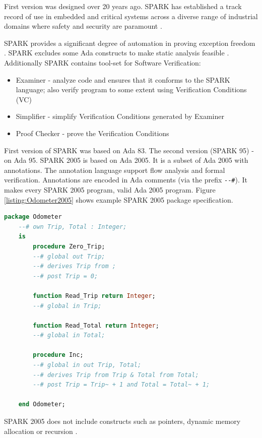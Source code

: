 First version was designed over 20 years ago. SPARK has established a track record of use in embedded and critical systems across a diverse range of industrial domains where safety and security are paramount \cite{Barnes:Book}. 

SPARK provides a significant degree of automation in proving exception freedom \cite{Spark:Article}. SPARK excludes some Ada constructs to make static analysis feasible \cite{Spark:Article}. Additionally SPARK contains tool-set for Software Verification:
\begin{itemize} \itemsep1pt \parskip0pt 
	\item Examiner - analyze code and ensures that it conforms to the SPARK language; also verify program to some extent using Verification Conditions (VC)
	\item Simplifier - simplify Verification Conditions generated by Examiner
	\item Proof Checker - prove the Verification Conditions
\end{itemize}

First version of SPARK was based on Ada 83. The second version (SPARK 95) - on Ada 95. SPARK 2005 is based on Ada 2005. It is a subset of Ada 2005 with annotations. The annotation language support flow analysis and formal verification. Annotations are encoded in Ada comments (via the prefix \lstinline{--#}). It makes every SPARK 2005 program, valid Ada 2005 program. Figure \ref{listing:Odometer2005} shows example SPARK 2005 package specification.

\begin{lstlisting}[language=ada, frame=single, gobble=0, caption={SPARK 2005 code: Odometer \cite{Barnes:Book}}, label={listing:Odometer2005}]
	package Odometer
	--# own Trip, Total : Integer;
	is
		procedure Zero_Trip;
		--# global out Trip;
		--# derives Trip from ;
		--# post Trip = 0;

		function Read_Trip return Integer;
		--# global in Trip;

		function Read_Total return Integer;
		--# global in Total;

		procedure Inc;
		--# global in out Trip, Total;
		--# derives Trip from Trip & Total from Total;
		--# post Trip = Trip~ + 1 and Total = Total~ + 1;

	end Odometer;
\end{lstlisting} 

SPARK 2005 does not include constructs such as pointers, dynamic memory allocation or recursion \cite{Spark:Article}.

